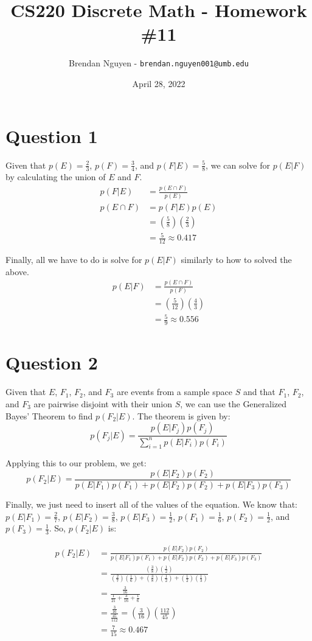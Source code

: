 \documentclass[letterpaper, 12pt]{article}
\title{CS220 Discrete Math - Homework \#11}
\author{Brendan Nguyen - \texttt{brendan.nguyen001@umb.edu}}
\date{April 28, 2022}
\begin{document}
\maketitle

\section*{Question 1}
Given that $p(E) = \frac{2}{3}$, $p(F) = \frac{3}{4}$, and $p(F|E) = \frac{5}{8}$, we can solve for $p(E|F)$ by calculating the union of $E$ and $F$.
\begin{align*}
p(F|E) &= \frac{p(E \cap F)}{p(E)}\\
p(E \cap F) &= p(F|E)p(E)\\
&= \left(\frac{5}{8}\right)\left(\frac{2}{3}\right)\\
&= \frac{5}{12} \approx 0.417
\end{align*}

Finally, all we have to do is solve for $p(E|F)$ similarly to how to solved the above.
\begin{align*}
p(E|F) &= \frac{p(E \cap F)}{p(F)}\\
&= \left(\frac{5}{12}\right)\left(\frac{4}{3}\right)\\
&= \frac{5}{9} \approx 0.556
\end{align*}

\section*{Question 2}
Given that $E$, $F_1$, $F_2$, and $F_3$ are events from a sample space $S$ and that $F_1$, $F_2$, and $F_3$ are pairwise disjoint with their union $S$, we can use the Generalized Bayes' Theorem to find $p(F_2|E)$. The theorem is given by:
\[p(F_j|E) = \frac{p(E|F_j)p(F_j)}{\sum^{n}_{i=1}p(E|F_i)p(F_i)}\]

Applying this to our problem, we get:
\[p(F_2|E) = \frac{p(E|F_2)p(F_2)}{p(E|F_1)p(F_1) + p(E|F_2)p(F_2) + p(E|F_3)p(F_3)}\]

Finally, we just need to insert all of the values of the equation. We know that: $p(E|F_1) = \frac{2}{7}$, $p(E|F_2) = \frac{3}{8}$, $p(E|F_3) = \frac{1}{2}$, $p(F_1) = \frac{1}{6}$, $p(F_2) = \frac{1}{2}$, and $p(F_3) = \frac{1}{3}$. So, $p(F_2|E)$ is:

\begin{align*}
p(F_2|E) &= \frac{p(E|F_2)p(F_2)}{p(E|F_1)p(F_1) + p(E|F_2)p(F_2) + p(E|F_3)p(F_3)}\\
&= \frac{\left(\frac{3}{8}\right)\left(\frac{1}{2}\right)}{\left(\frac{2}{7}\right)\left(\frac{1}{6}\right) + \left(\frac{3}{8}\right)\left(\frac{1}{2}\right) + \left(\frac{1}{2}\right)\left(\frac{1}{3}\right)}\\
&= \frac{\frac{3}{16}}{\frac{1}{21} + \frac{3}{16} + \frac{1}{6}}\\
&= \frac{\frac{3}{16}}{\frac{45}{112}} = \left(\frac{3}{16}\right)\left(\frac{112}{45}\right)\\
&= \frac{7}{15} \approx 0.467
\end{align*}
\end{document}
